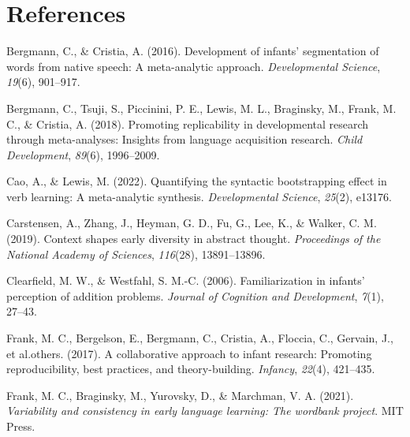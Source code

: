 \documentclass[10pt, letterpaper]{article}
\newenvironment{CSLReferences}%
  {}%
  {\par}
\begin{document}
\hypertarget{references}{%
\section{References}\label{references}}

\setlength{\parindent}{-0.1in} 
\setlength{\leftskip}{0.125in}

\noindent

\hypertarget{refs}{}
\begin{CSLReferences}{1}{0}
\leavevmode{}%
Bergmann, C., \& Cristia, A. (2016). Development of infants'
segmentation of words from native speech: A meta-analytic approach.
\emph{Developmental Science}, \emph{19}(6), 901--917.

\leavevmode{}%
Bergmann, C., Tsuji, S., Piccinini, P. E., Lewis, M. L., Braginsky, M.,
Frank, M. C., \& Cristia, A. (2018). Promoting replicability in
developmental research through meta-analyses: Insights from language
acquisition research. \emph{Child Development}, \emph{89}(6),
1996--2009.

\leavevmode{}%
Cao, A., \& Lewis, M. (2022). Quantifying the syntactic bootstrapping
effect in verb learning: A meta-analytic synthesis. \emph{Developmental
Science}, \emph{25}(2), e13176.

\leavevmode{}%
Carstensen, A., Zhang, J., Heyman, G. D., Fu, G., Lee, K., \& Walker, C.
M. (2019). Context shapes early diversity in abstract thought.
\emph{Proceedings of the National Academy of Sciences}, \emph{116}(28),
13891--13896.

\leavevmode{}%
Clearfield, M. W., \& Westfahl, S. M.-C. (2006). Familiarization in
infants' perception of addition problems. \emph{Journal of Cognition and
Development}, \emph{7}(1), 27--43.

\leavevmode{}%
Frank, M. C., Bergelson, E., Bergmann, C., Cristia, A., Floccia, C.,
Gervain, J., et al.others. (2017). A collaborative approach to infant
research: Promoting reproducibility, best practices, and
theory-building. \emph{Infancy}, \emph{22}(4), 421--435.

\leavevmode{}%
Frank, M. C., Braginsky, M., Yurovsky, D., \& Marchman, V. A. (2021).
\emph{Variability and consistency in early language learning: The
wordbank project}. MIT Press.


\end{CSLReferences}
\end{document}
